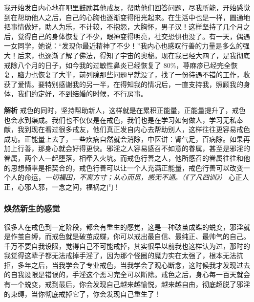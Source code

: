 \begin{case}
    我开始发自内心地在吧里鼓励其他戒友，帮助他们回答问题，尽我所能，开始感觉到在帮助他人之后，自己的心胸也逐渐变得阳光起来。在生活中也是一样，圆通地把事情做好，助人为乐，不计较，不抱怨，大胸怀，男子汉！这样坚持了几个月之后，觉得自己的身体恢复了不少，眼神变得明亮，社交恐惧也没了。有一天，偶遇一女同学，她说：“发现你最近精神了不少！”我内心也感叹行善的力量是多么的强大！后来，也逐渐了解了佛法，得知了宇宙的奥秘。现在我已经大四了，是我彻底戒除八个月的日子，如今我的过敏性鼻炎已经恢复了 80\%，荨麻疹已经完全恢复，脑力也恢复了大半，前列腺那些问题早就没了，找了一份待遇不错的工作，收获了爱情。要特别感谢我的另一半，在得知我的情况后，一直支持我，照顾我的身体，我们约定好，不到结婚的时候，不行房事。

    \textbf{解析} 戒色的同时，坚持帮助新人，这样就是在累积正能量，正能量提升了，戒色也会水到渠成。我们也不仅仅是在戒色，我们也是在学习如何做人，学习无私奉献，我到现在看过很多戒友，他们真正发自内心去帮助别人，这样往往更容易戒色成功。正能量上去了，一些疾病自然就会消除，中医讲：肾气足，百病除。如果再加上行善，那身心就会好得更快。邪淫之人容易感召不如意的眷属，甚至是邪淫的眷属，两个人一起堕落，相牵入火坑。而戒色行善之人，他所感召的眷属往往和他的思想频率是相契合的，戒色行善可以让一个人充满正能量，戒色行善可以改变一个人的命运，\textit{一切福田，不离方寸；从心而觅，感无不通。（《了凡四训》）} 心正人正，心邪人邪，一念之间，福祸之门！
\end{case}

\subsubsection{焕然新生的感觉}

很多人在戒色到一定阶段，都会有重生的感觉，这是一种破茧成蝶的蜕变，邪淫就是作茧自缚，而戒色就是破茧成蝶，你可以戒出最自信、最纯正、最帅气的自己。千万不要自我设限，觉得自己不可能戒掉，其实很早以前我也这样认为过，那时的我觉得这辈子都无法戒掉手淫了，因为那个怪圈的魔力实在太强了，根本无法抗拒，多年之后，当我学会了专业戒色，当我学会了观心断念，这时候我才发现过去的自我设限是错误的，手淫这个恶习完全可以断除。戒色之后，身心每一百天就会有一个蜕变，戒到最后，你会发现自己越来越愉悦，越来越自由，彻底超脱了邪淫的束缚，当你彻底戒掉它了，你会发现自己重生了！

